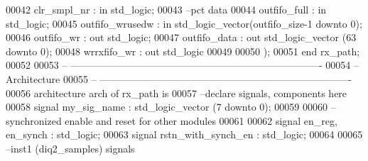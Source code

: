 \begin{DoxyCode}
00042         \textcolor{vhdlchar}{clr_smpl_nr}         \textcolor{vhdlchar}{:} \textcolor{keywordflow}{in} \textcolor{comment}{std\_logic};     
00043 \textcolor{keyword}{        --pct data}
00044         \textcolor{vhdlchar}{outfifo_full}        \textcolor{vhdlchar}{:} \textcolor{keywordflow}{in} \textcolor{comment}{std\_logic};
00045         \textcolor{vhdlchar}{outfifo_wrusedw} \textcolor{vhdlchar}{:} \textcolor{keywordflow}{in} \textcolor{comment}{std\_logic\_vector}\textcolor{vhdlchar}{(}\textcolor{vhdlchar}{outfifo_size}\textcolor{vhdlchar}{-}\textcolor{vhdllogic}{}\textcolor{vhdllogic}{1} \textcolor{keywordflow}{downto} \textcolor{vhdllogic}{}\textcolor{vhdllogic}{0}\textcolor{vhdlchar}{)};
00046         \textcolor{vhdlchar}{outfifo_wr}          \textcolor{vhdlchar}{:} \textcolor{keywordflow}{out} \textcolor{comment}{std\_logic};
00047         \textcolor{vhdlchar}{outfifo_data}        \textcolor{vhdlchar}{:} \textcolor{keywordflow}{out} \textcolor{comment}{std\_logic\_vector} \textcolor{vhdlchar}{(}\textcolor{vhdllogic}{}\textcolor{vhdllogic}{63} \textcolor{keywordflow}{downto} \textcolor{vhdllogic}{}\textcolor{vhdllogic}{0}\textcolor{vhdlchar}{)};
00048         \textcolor{vhdlchar}{wrrxfifo_wr}         \textcolor{vhdlchar}{:} \textcolor{keywordflow}{out} \textcolor{comment}{std\_logic}
00049         
00050         \textcolor{vhdlchar}{)};
00051 \textcolor{keywordflow}{end} \textcolor{vhdlchar}{rx\_path};
00052 
00053 \textcolor{keyword}{-- ----------------------------------------------------------------------------}
00054 \textcolor{keyword}{-- Architecture}
00055 \textcolor{keyword}{-- ----------------------------------------------------------------------------}
00056 \textcolor{keywordflow}{architecture} arch \textcolor{keywordflow}{of} rx_path is
00057 \textcolor{keyword}{--declare signals,  components here}
00058 \textcolor{keywordflow}{signal} \textcolor{vhdlchar}{my_sig_name} \textcolor{vhdlchar}{:} \textcolor{comment}{std\_logic\_vector} \textcolor{vhdlchar}{(}\textcolor{vhdllogic}{}\textcolor{vhdllogic}{7} \textcolor{keywordflow}{downto} \textcolor{vhdllogic}{}\textcolor{vhdllogic}{0}\textcolor{vhdlchar}{)}; 
00059 
00060 \textcolor{keyword}{-- synchronized enable and reset for other modules}
00061 
00062 \textcolor{keywordflow}{signal} \textcolor{vhdlchar}{en_reg}\textcolor{vhdlchar}{,} \textcolor{vhdlchar}{en_synch}     \textcolor{vhdlchar}{:} \textcolor{comment}{std\_logic}; 
00063 \textcolor{keywordflow}{signal} \textcolor{vhdlchar}{rstn_with_synch_en}   \textcolor{vhdlchar}{:} \textcolor{comment}{std\_logic}; 
00064 
00065 \textcolor{keyword}{--inst1 (diq2\_samples) signals}

\end{DoxyCode}
